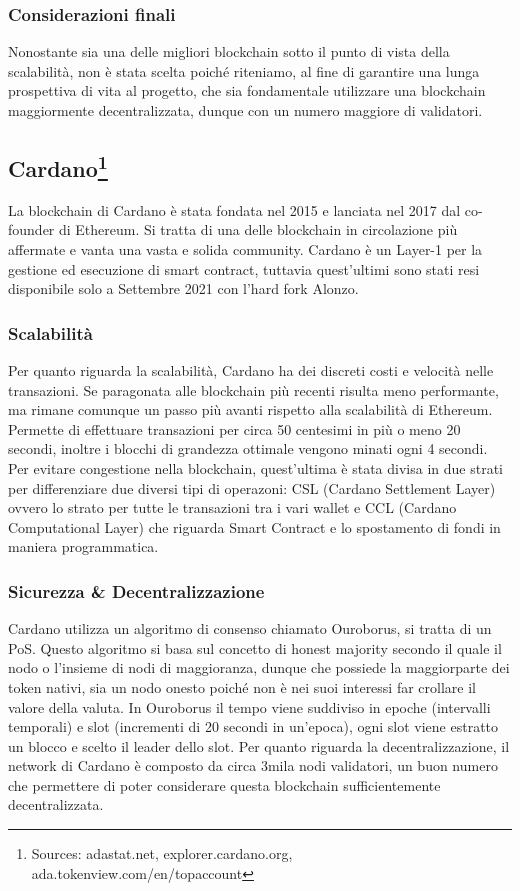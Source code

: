 \documentclass[a4paper, 12pt]{article}
\begin{document}
\subsubsection*{Considerazioni finali}
Nonostante sia una delle migliori blockchain sotto il punto di vista della scalabilità, non è stata scelta poiché riteniamo, al fine di garantire una lunga prospettiva di vita al progetto, che sia fondamentale utilizzare una blockchain maggiormente decentralizzata, dunque con un numero maggiore di validatori.

\newpage
\subsection*{Cardano\footnote{Sources: adastat.net, explorer.cardano.org, ada.tokenview.com/en/topaccount}}
La blockchain di Cardano è stata fondata nel 2015 e lanciata nel 2017 dal co-founder di Ethereum. Si tratta di una delle blockchain in circolazione più affermate e vanta una vasta e solida community. Cardano è un Layer-1 per la gestione ed esecuzione di smart contract, tuttavia quest'ultimi sono stati resi disponibile solo a Settembre 2021 con l'hard fork Alonzo.
\subsubsection*{Scalabilità}
Per quanto riguarda la scalabilità, Cardano ha dei discreti costi e velocità nelle transazioni. Se paragonata alle blockchain più recenti risulta meno performante, ma rimane comunque un passo più avanti rispetto alla scalabilità di Ethereum. Permette di effettuare transazioni per circa 50 centesimi in più o meno 20 secondi, inoltre i blocchi di grandezza ottimale vengono minati ogni 4 secondi. Per evitare congestione nella blockchain, quest'ultima è stata divisa in due strati per differenziare due diversi tipi di operazoni: CSL (Cardano Settlement Layer) ovvero lo strato per tutte le transazioni tra i vari wallet e CCL (Cardano Computational Layer) che riguarda Smart Contract e lo spostamento di fondi in maniera programmatica.
\subsubsection*{Sicurezza \& Decentralizzazione}
Cardano utilizza un algoritmo di consenso chiamato Ouroborus, si tratta di un PoS. Questo algoritmo si basa sul concetto di honest majority secondo il quale il nodo o l'insieme di nodi di maggioranza, dunque che possiede la maggiorparte dei token nativi, sia un nodo onesto poiché non è nei suoi interessi far crollare il valore della valuta. In Ouroborus il tempo viene suddiviso in epoche (intervalli temporali) e slot (incrementi di 20 secondi in un'epoca), ogni slot viene estratto un blocco e scelto il leader dello slot.
Per quanto riguarda la decentralizzazione, il network di Cardano è composto da circa 3mila nodi validatori, un buon numero che permettere di poter considerare questa blockchain sufficientemente decentralizzata.
\end{document}
